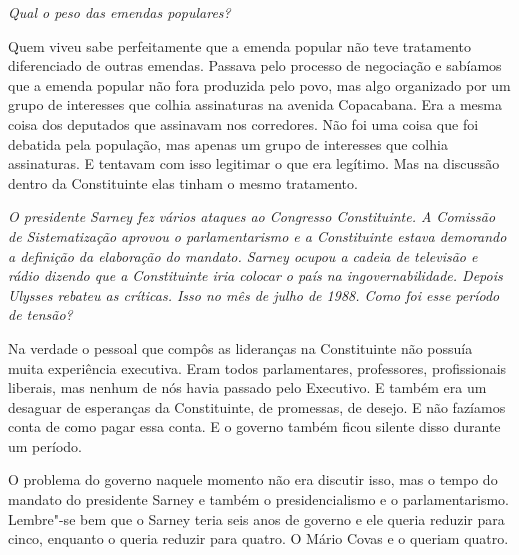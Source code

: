 \medskip

\noindent\emph{Qual o peso das emendas populares?}

Quem viveu sabe perfeitamente que a emenda popular não
teve tratamento diferenciado de outras emendas. Passava pelo processo de
negociação e sabíamos que a emenda popular não fora produzida pelo povo,
mas algo organizado por um grupo de interesses que colhia assinaturas na
avenida Copacabana. Era a mesma coisa dos deputados que assinavam nos
corredores. Não foi uma coisa que foi debatida pela população, mas
apenas um grupo de interesses que colhia assinaturas. E tentavam com
isso legitimar o que era legítimo. Mas na discussão dentro da
Constituinte elas tinham o mesmo tratamento.

\medskip

\noindent\emph{O presidente Sarney fez vários ataques ao Congresso
Constituinte. A Comissão de Sistematização aprovou o parlamentarismo e a
Constituinte estava demorando a definição da elaboração do mandato.
Sarney ocupou a cadeia de televisão e rádio dizendo que a Constituinte
iria colocar o país na ingovernabilidade. Depois Ulysses rebateu as
críticas. Isso no mês de julho de 1988. Como foi esse período de
tensão?}

Na verdade o pessoal que compôs as lideranças na
Constituinte não possuía muita experiência executiva. Eram todos
parlamentares, professores, profissionais liberais, mas nenhum de nós
havia passado pelo Executivo. E também era um desaguar de esperanças da
Constituinte, de promessas, de desejo. E não fazíamos conta de como
pagar essa conta. E o governo também ficou silente disso durante um
período.

O problema do governo naquele momento não era discutir isso, mas o tempo
do mandato do presidente Sarney e também o presidencialismo e o
parlamentarismo. Lembre"-se bem que o Sarney teria seis anos de governo e
ele queria reduzir para cinco, enquanto o  queria reduzir para
quatro. O Mário Covas e o  queriam quatro.

